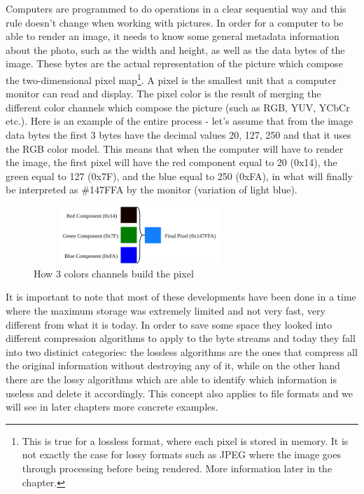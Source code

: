 \begin{multicols*}{2}
Computers are programmed to do operations in a clear sequential way and this rule doesn't change when working with pictures. In order for a computer to be able to render an image, it needs to know some general metadata information about the photo, such as the width and height, as well as the data bytes of the image. These bytes are the actual representation of the picture which compose the two-dimensional pixel map\footnote{This is true for a lossless format, where each pixel is stored in memory. It is not exactly the case for lossy formats such as JPEG where the image goes through processing before being rendered. More information later in the chapter.}. A pixel is the smallest unit that a computer monitor can read and display. The pixel color is the result of merging the different color channels which compose the picture (such as RGB, YUV, YCbCr etc.). Here is an example of the entire process - let's assume that from the image data bytes the first 3 bytes have the decimal values 20, 127, 250 and that it uses the RGB color model. This means that when the computer will have to render the image, the first pixel will have the red component equal to 20 (0x14), the green equal to 127 (0x7F), and the blue equal to 250 (0xFA), in what will finally be interpreted as \#147FFA by the monitor (variation of light blue). 

\begin{figure}[H]
    \centering
    \includegraphics[width=8cm,height=2.15cm,keepaspectratio]{pics/how_a_pixel_works}
    \caption{How 3 colors channels build the pixel}
    \label{Pixel Creation}
\end{figure}

It is important to note that most of these developments have been done in a time where the maximum storage was extremely limited and not very fast, very different from what it is today. In order to save some space they looked into different compression algorithms to apply to the byte streams and today they fall into two distinict categories: the lossless algorithms are the ones that compress all the original information without destroying any of it, while on the other hand there are the lossy algorithms which are able to identify which information is useless and delete it accordingly. This concept also applies to file formats and we will see in later chapters more concrete examples. 


\end{multicols*}
